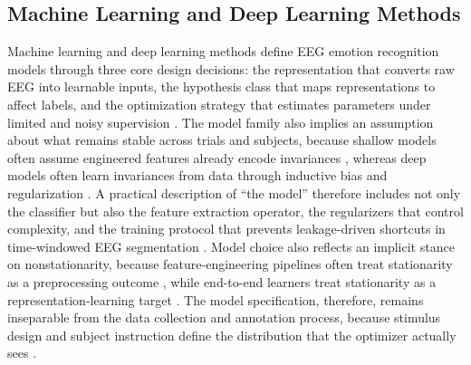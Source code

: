 \documentclass{WileyMSP-template}
\begin{document}
\subsection{Machine Learning and Deep Learning Methods}

Machine learning and deep learning methods define EEG emotion recognition models through three core design decisions: the representation that converts raw EEG into learnable inputs, the hypothesis class that maps representations to affect labels, and the optimization strategy that estimates parameters under limited and noisy supervision \cite{yroyhb2019deeplear}. The model family also implies an assumption about what remains stable across trials and subjects, because shallow models often assume engineered features already encode invariances \cite{smalar2019emotions}, whereas deep models often learn invariances from data through inductive bias and regularization \cite{wlizzh2021physiolo}. A practical description of ``the model'' therefore includes not only the classifier but also the feature extraction operator, the regularizers that control complexity, and the training protocol that prevents leakage-driven shortcuts in time-windowed EEG segmentation \cite{nssuha2020eegbased}. Model choice also reflects an implicit stance on nonstationarity, because feature-engineering pipelines often treat stationarity as a preprocessing outcome \cite{ztliuq2019electroe}, while end-to-end learners treat stationarity as a representation-learning target \cite{megger2019emotionr}. The model specification, therefore, remains inseparable from the data collection and annotation process, because stimulus design and subject instruction define the distribution that the optimizer actually sees \cite{ctanfs2018asurveyo}.
\end{document}
